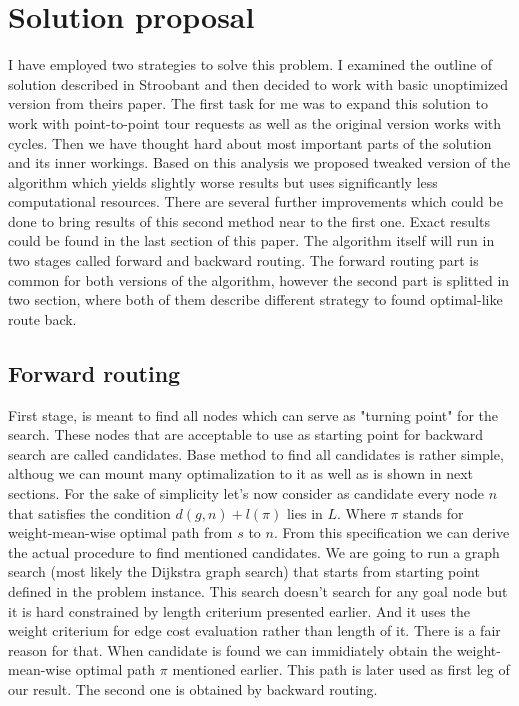 \documentclass{ctuthesis}
\begin{document}
\chapter{Solution proposal}
I have employed two strategies to solve this problem. I examined the outline of solution described in Stroobant\cite{stroobant} and then decided to work with basic unoptimized version from theirs paper. The first task for me was to expand this solution to work with point-to-point tour requests as well as the original version works with cycles. Then we have thought hard about most important parts of the solution and its inner workings. Based on this analysis we proposed tweaked version of the algorithm  which yields slightly worse results but uses significantly less computational resources. There are several further improvements which could be done to bring results of this second method near to the first one. Exact results could be found in the last section of this paper.
The algorithm itself will run in two stages called forward and backward routing. The forward routing part is common for both versions of the algorithm, however the second part is splitted in two section, where both of them describe different strategy to found optimal-like route back.


\section{Forward routing}
First stage, is meant to find all nodes which can serve as "turning point" for the search. These nodes that are acceptable to use as starting point for backward search are called candidates. Base method to find all candidates is rather simple, althoug we can mount many optimalization to it as well as is shown in next sections. For the sake of simplicity let's now consider as candidate every node \(n\) that satisfies the condition \(d(g, n) + l(\pi)\) lies in \(L\). Where \(\pi\) stands for weight-mean-wise optimal path from \(s\) to \(n\). From this specification we can derive the actual procedure to find mentioned candidates.
We are going to run a graph search (most likely the Dijkstra graph search) that starts from starting point defined in the problem instance. This search doesn't search for any goal node but it is hard constrained by length criterium presented earlier. And it uses the weight criterium for edge cost evaluation rather than length of it. There is a fair reason for that. When candidate is found we can immidiately obtain the weight-mean-wise optimal path \(\pi\) mentioned earlier. This path is later used as first leg of our result. The second one is obtained by backward routing.
\end{document}
